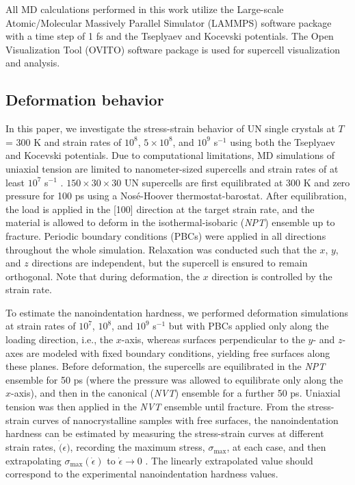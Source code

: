 \documentclass[applsci,article,submit,pdftex,moreauthors]{Definitions/mdpi}
\newcommand{\?}{\stackrel{?}{=}}
\begin{document}
All MD calculations performed in this work utilize the Large-scale Atomic/Molecular Massively Parallel Simulator (LAMMPS) software package \cite{Thompson2022} with a time step of 1 fs and the Tseplyaev \cite{Tseplyaev2016} and Kocevski \cite{Kocevski2022II} potentials. The Open Visualization Tool (OVITO) software package \cite{Stukowski2010} is used for supercell visualization and analysis.

\subsection{Deformation behavior}

In this paper, we investigate the stress-strain behavior of UN single crystals at $T$ = 300 K and strain rates of $10^8$, $5 \times 10^8$, and $10^9$ s$^{-1}$ using both the Tseplyaev and Kocevski potentials. Due to computational limitations, MD simulations of uniaxial tension are limited to nanometer-sized supercells and strain rates of at least $10^7$ s$^{-1}$ \cite{Lao2013}. $150 \times 30 \times 30$ UN supercells are first equilibrated at 300 K and zero pressure for 100 ps using a Nosé-Hoover thermostat-barostat. After equilibration, the load is applied in the [100] direction at the target strain rate, and the material is allowed to deform in the isothermal-isobaric (\textit{NPT}) ensemble up to fracture. Periodic boundary conditions (PBCs) were applied in all directions throughout the whole simulation. Relaxation was conducted such that the $x$, $y$, and $z$ directions are independent, but the supercell is ensured to remain orthogonal. Note that during deformation, the $x$ direction is controlled by the strain rate.

To estimate the nanoindentation hardness, we performed deformation simulations at strain rates of $10^7$, $10^8$, and $10^9$ s$^{-1}$ but with PBCs applied only along the loading direction, i.e., the $x$-axis, whereas surfaces perpendicular to the $y$- and $z$-axes are modeled with fixed boundary conditions, yielding free surfaces along these planes. Before deformation, the supercells are equilibrated in the \textit{NPT} ensemble for 50 ps (where the pressure was allowed to equilibrate only along the $x$-axis), and then in the canonical (\textit{NVT}) ensemble for a further 50 ps. Uniaxial tension was then applied in the \textit{NVT} ensemble until fracture. From the stress-strain curves of nanocrystalline samples with free surfaces, the nanoindentation hardness can be estimated by measuring the stress-strain curves at different strain rates, $\Dot(\epsilon)$, recording the maximum stress, $\sigma_\mathrm{max}$, at each case, and then extrapolating $\sigma_\mathrm{max}(\Dot{\epsilon})$ to $\Dot{\epsilon} \rightarrow 0$ \cite{Ivashchenko2007}. The linearly extrapolated value should correspond to the experimental nanoindentation hardness values.
\end{document}
